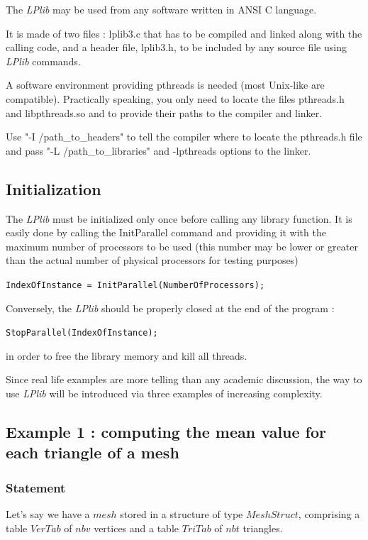 \documentclass[a4paper,12pt]{article}
\begin{document}
The \emph{LPlib} may be used from any software written in ANSI C language.

It is made of two files : lplib3.c that has to be compiled and linked along with the calling code, and a header file, lplib3.h, to be included by any source file using \emph{LPlib} commands.

A software environment providing pthreads is needed (most Unix-like are compatible). Practically speaking, you only need to locate the files pthreads.h and libpthreads.so and to provide their paths to the compiler and linker.

Use "-I /path\_to\_headers" to tell the compiler where to locate the pthreads.h file and pass "-L /path\_to\_libraries" and -lpthreads options to the linker.


\subsection{Initialization}

The \emph{LPlib} must be initialized only once before calling any library function. It is easily done by calling the InitParallel command and providing it with the maximum number of processors to be used (this number may be lower or greater than the actual number of physical processors for testing purposes)

\medskip
\tt{IndexOfInstance = InitParallel(NumberOfProcessors);}
\normalfont
\medskip

\noindent Conversely, the \emph{LPlib} should be properly closed at the end of the program :

\medskip
\tt{StopParallel(IndexOfInstance);}
\normalfont
\medskip

\noindent in order to free the library memory and kill all threads.

Since real life examples are more telling than any academic discussion, the way to use \emph{LPlib} will be introduced via three examples of increasing complexity.

\subsection{Example 1 : computing the mean value for each triangle of a mesh}

\subsubsection{Statement}

Let's say we have a $mesh$ stored in a structure of type $MeshStruct$, comprising a table $VerTab$ of $nbv$ vertices and a table $TriTab$ of $nbt$ triangles.
\end{document}
